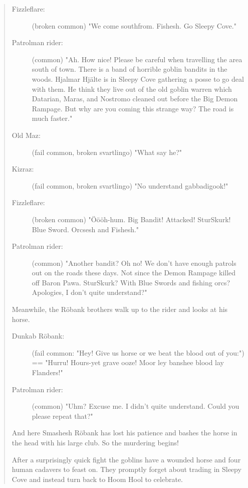\begin{quote}
\begin{small}
\begin{description}
\item[Fizzleflare:] \vsmall (broken common) \small
"We come southfrom. Fishesh. Go Sleepy Cove."

\item[Patrolman rider:] \vsmall (common) \small
"Ah. How nice! Please be careful when travelling the area south of town. There is a band of horrible goblin bandits in the woods. Hjalmar Hjälte is in Sleepy Cove gathering a posse to go deal with them. He think they live out of the old goblin warren which Datarian, Maras, and Nostromo cleaned out before the Big Demon Rampage. But why are you coming this strange way? The road is much faster."

\item[Old Maz:] \vsmall (fail common, broken svartlingo) \small
"What say he?"

\item[Kizraz:] \vsmall (fail common, broken svartlingo) \small
"No understand gabbadigook!"

\item[Fizzleflare:] \vsmall (broken common) \small
"Öööh-hum. Big Bandit! Attacked! SturSkurk! Blue Sword. Orcsesh and Fishesh."

\item[Patrolman rider:] \vsmall (common) \small
"Another bandit? Oh no! We don't have enough patrols out on the roads these days. Not since the Demon Rampage killed off Baron Pawa. SturSkurk? With Blue Swords and fishing orcs? Apologies, I don't quite understand?"

\end{description}
Meanwhile, the Röbank brothers walk up to the rider and looks at his horse.
\begin{description}

\item[Dunkab Röbank:] \vsmall (fail common: "Hey! Give us horse or we beat the blood out of you:") \small
== "Hurru! Hours-yet grave ooze! Moor ley banshee blood lay Flanders!"

\item[Patrolman rider:] \vsmall (common) \small
"Uhm? Excuse me. I didn't quite understand. Could you please repeat that?"

\end{description}

And here Smashesh Röbank has lost his patience and bashes the horse in the head with his large club. So the murdering begins!

After a surprisingly quick fight the goblins have a wounded horse and four human cadavers to feast on. They promptly forget about trading in Sleepy Cove and instead turn back to Hoom Hool to celebrate.

\end{small}
\end{quote}


